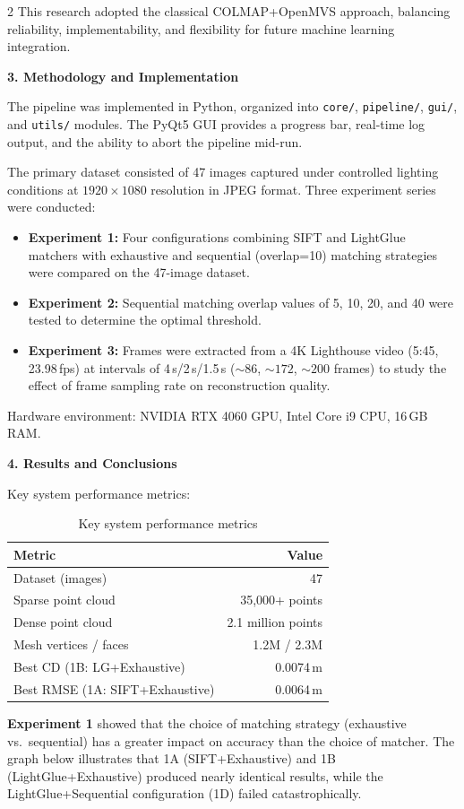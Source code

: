 \begin{multicols}{2}
This research adopted the classical COLMAP+OpenMVS approach, balancing reliability, implementability, and flexibility for future machine learning integration.

\noindent\textbf{3. Methodology and Implementation}

The pipeline was implemented in Python, organized into \texttt{core/}, \texttt{pipeline/}, \texttt{gui/}, and \texttt{utils/} modules. The PyQt5 GUI provides a progress bar, real-time log output, and the ability to abort the pipeline mid-run.

The primary dataset consisted of 47 images captured under controlled lighting conditions at $1920\times1080$ resolution in JPEG format. Three experiment series were conducted:

\begin{itemize}
    \item \textbf{Experiment 1:} Four configurations combining SIFT and LightGlue matchers with exhaustive and sequential (overlap=10) matching strategies were compared on the 47-image dataset.
    \item \textbf{Experiment 2:} Sequential matching overlap values of 5, 10, 20, and 40 were tested to determine the optimal threshold.
    \item \textbf{Experiment 3:} Frames were extracted from a 4K Lighthouse video (5:45, 23.98\,fps) at intervals of 4\,s/2\,s/1.5\,s (${\sim}86$, ${\sim}172$, ${\sim}200$ frames) to study the effect of frame sampling rate on reconstruction quality.
\end{itemize}

Hardware environment: NVIDIA RTX 4060 GPU, Intel Core i9 CPU, 16\,GB RAM.

\noindent\textbf{4. Results and Conclusions}

Key system performance metrics:

\begin{table}[H]
\centering
\caption{Key system performance metrics}
\label{tab:summary_en_results}
\scriptsize
\setlength{\tabcolsep}{3pt}
\begin{tabular}{|l|r|}
\hline
\textbf{Metric} & \textbf{Value} \\ \hline
Dataset (images) & 47 \\ \hline
Sparse point cloud & 35{,}000+ points \\ \hline
Dense point cloud & 2.1 million points \\ \hline
Mesh vertices / faces & 1.2M / 2.3M \\ \hline
Best CD (1B: LG+Exhaustive) & 0.0074\,m \\ \hline
Best RMSE (1A: SIFT+Exhaustive) & 0.0064\,m \\ \hline
\end{tabular}
\end{table}

\textbf{Experiment 1} showed that the choice of matching strategy (exhaustive vs.\ sequential) has a greater impact on accuracy than the choice of matcher. The graph below illustrates that 1A (SIFT+Exhaustive) and 1B (LightGlue+Exhaustive) produced nearly identical results, while the LightGlue+Sequential configuration (1D) failed catastrophically.
\end{multicols}

